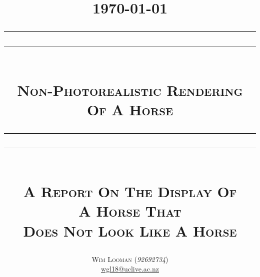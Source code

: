 \title{
  \centering
  \flushright\footnotesize\today\\
  \centering
  \rule{\textwidth}{1.6pt}\vspace*{-\baselineskip}\vspace*{2pt}
  \rule{\textwidth}{0.4pt}\\[\baselineskip]
  {\Huge \scshape
    Non-Photorealistic Rendering\\
    Of A Horse\\[10pt]
  }
  \rule{\textwidth}{0.4pt}\vspace*{-\baselineskip}\vspace*{3.2pt}
  \rule{\textwidth}{1.6pt}\\[0.5\baselineskip]
  {\scshape \large
    A Report On The Display Of\\
    A Horse That\\
    Does Not Look Like A Horse\\
  }
}

\author{
  \vspace*{0.5\baselineskip}
  {\Large
    {\scshape Wim Looman} (\emph{92692734})\\
    \href{mailto:wgl18@uclive.ac.nz}{wgl18@uclive.ac.nz}\\
  }
}

